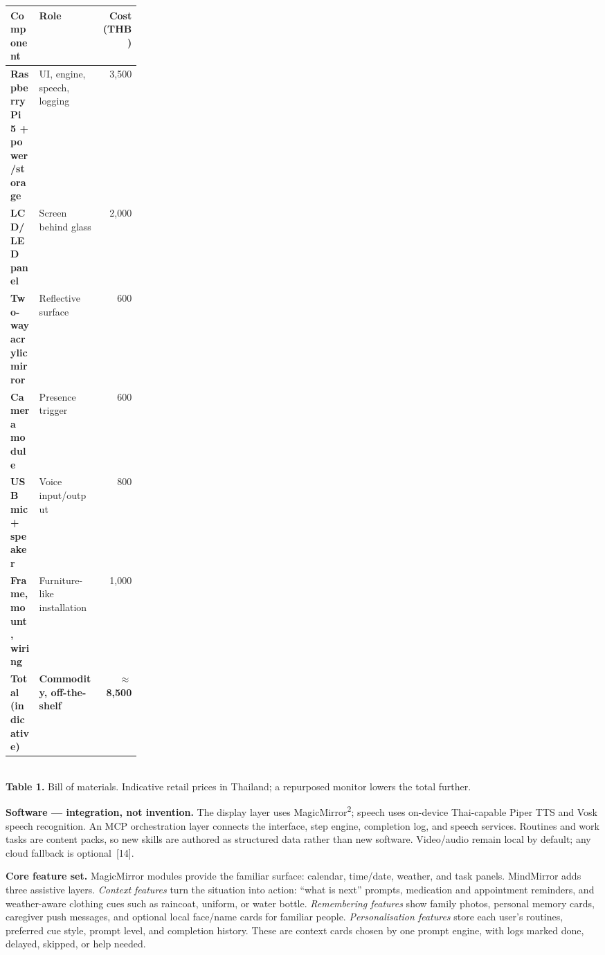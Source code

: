     \begin{center}
    {\footnotesize
    \renewcommand{\arraystretch}{1.05}
    \begin{tabularx}{\linewidth}{@{}>{\bfseries}p{0.22\linewidth} X r@{}}
      \hline
      Component & Role & Cost (THB) \\
      \hline
      Raspberry Pi 5 + power/storage & UI, engine, speech, logging & 3{,}500 \\
      LCD/LED panel & Screen behind glass & 2{,}000 \\
      Two-way acrylic mirror & Reflective surface & 600 \\
      Camera module & Presence trigger & 600 \\
      USB mic + speaker & Voice input/output & 800 \\
      Frame, mount, wiring & Furniture-like installation & 1{,}000 \\
      \hline
      \textbf{Total (indicative)} & \textbf{Commodity, off-the-shelf} & \textbf{$\approx$ 8{,}500} \\
      \hline
    \end{tabularx}\\[0.3em]
    \textbf{Table 1.} Bill of materials. Indicative retail prices in Thailand; a
    repurposed monitor lowers the total further.
    }
    \end{center}

    \textbf{Software --- integration, not invention.} The display layer uses
    MagicMirror\textsuperscript{2}; speech uses on-device Thai-capable Piper TTS and
    Vosk speech recognition. An MCP orchestration layer connects the interface, step
    engine, completion log, and speech services. Routines and work tasks are content
    packs, so new skills are authored as structured data rather than new software.
    Video/audio remain local by default; any cloud fallback is optional~[14].

    \textbf{Core feature set.} MagicMirror modules provide the familiar surface:
    calendar, time/date, weather, and task panels. MindMirror adds three assistive
    layers. \emph{Context features} turn the situation into action: ``what is next''
    prompts, medication and appointment reminders, and weather-aware clothing cues such
    as raincoat, uniform, or water bottle. \emph{Remembering features} show family
    photos, personal memory cards, caregiver push messages, and optional local
    face/name cards for familiar people. \emph{Personalisation features} store each
    user's routines, preferred cue style, prompt level, and completion history. These
    are context cards chosen by one prompt engine, with logs marked done, delayed,
    skipped, or help needed.


